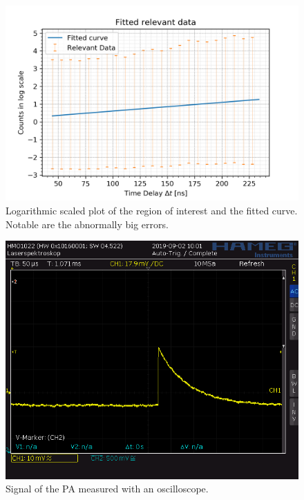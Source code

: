 \documentclass[30pt,a4paper]{article}
\begin{document}
 	\begin{figure}[h]
 	\includegraphics{Bilder/log_relevant_fit}
 	\centering
 	\caption[Logarithmic Plot]{\small Logarithmic scaled plot of the region of interest and the fitted 
 	curve. Notable are the abnormally big errors.}
 	\label{log_relevant_fit}
	\end{figure}
	\begin{figure}
		\includegraphics[scale=0.42]{Bilder/OsziPA}
		\centering
		\caption[PA Signal]{Signal of the PA measured with an oscilloscope.}
		\label{PA}
	\end{figure}
\end{document}
